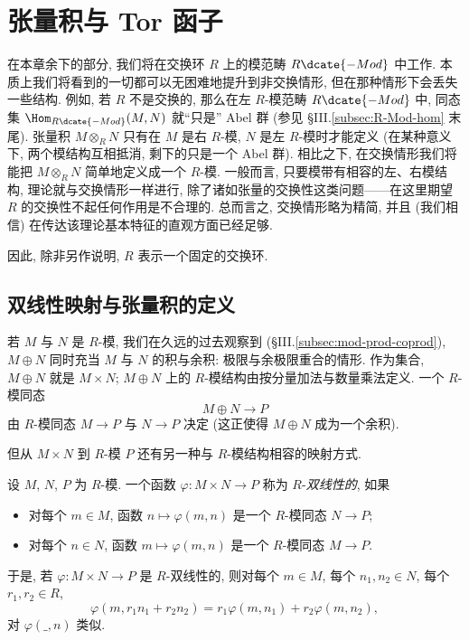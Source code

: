 \section{张量积与 Tor 函子}
\label{sec:tensor-tor}

在本章余下的部分, 我们将在交换环 $R$ 上的模范畴 $R\dcate{-Mod}$ 中工作. 本质上我们将看到的一切都可以无困难地提升到非交换情形, 但在那种情形下会丢失一些结构. 例如, 若 $R$ 不是交换的, 那么在左 $R$-模范畴 $R\dcate{-Mod}$ 中, 同态集 $\Hom_{R\dcate{-Mod}}(M,N)$ 就``只是'' Abel 群 (参见 §III.\ref{subsec:R-Mod-hom} 末尾). 张量积 $M\otimes_R N$ 只有在 $M$ 是右 $R$-模, $N$ 是左 $R$-模时才能定义 (在某种意义下, 两个模结构互相抵消, 剩下的只是一个 Abel 群). 相比之下, 在交换情形我们将能把 $M\otimes_R N$ 简单地定义成一个 $R$-模. 一般而言, 只要模带有相容的左、右模结构, 理论就与交换情形一样进行, 除了诸如张量的交换性这类问题——在这里期望 $R$ 的交换性不起任何作用是不合理的. 总而言之, 交换情形略为精简, 并且 (我们相信) 在传达该理论基本特征的直观方面已经足够.

因此, 除非另作说明, $R$ 表示一个固定的交换环.

\subsection{双线性映射与张量积的定义}
\label{subsec:bilinear-tensor-def}

若 $M$ 与 $N$ 是 $R$-模, 我们在久远的过去观察到 (§III.\ref{subsec:mod-prod-coprod}), $M\oplus N$ 同时充当 $M$ 与 $N$ 的积与余积: 极限与余极限重合的情形. 作为集合, $M\oplus N$ 就是 $M\times N$; $M\oplus N$ 上的 $R$-模结构由按分量加法与数量乘法定义. 一个 $R$-模同态
\[
M\oplus N\to P
\]
由 $R$-模同态 $M\to P$ 与 $N\to P$ 决定 (这正使得 $M\oplus N$ 成为一个余积).

但从 $M\times N$ 到 $R$-模 $P$ 还有另一种与 $R$-模结构相容的映射方式.

\begin{definition}\label{def:tensor-product}
设 $M$, $N$, $P$ 为 $R$-模. 一个函数 $\varphi:M\times N\to P$ 称为 $R$-\emph{双线性的}, 如果
\begin{itemize}
\item 对每个 $m\in M$, 函数 $n\mapsto\varphi(m,n)$ 是一个 $R$-模同态 $N\to P$;
\item 对每个 $n\in N$, 函数 $m\mapsto\varphi(m,n)$ 是一个 $R$-模同态 $M\to P$.
\end{itemize}
于是, 若 $\varphi:M\times N\to P$ 是 $R$-双线性的, 则对每个 $m\in M$, 每个 $n_1,n_2\in N$, 每个 $r_1,r_2\in R$,
\[
\varphi(m,r_1n_1+r_2n_2)=r_1\varphi(m,n_1)+r_2\varphi(m,n_2),
\]
对 $\varphi(\_,n)$ 类似.
\end{definition}

